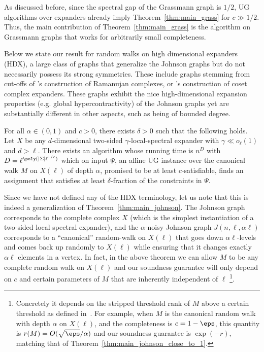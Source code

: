 As discussed before, since the spectral gap of the Grassmann graph is $1/2$, UG algorithms over expanders already imply Theorem~\ref{thm:main_grass} for $c \gg 1/2$. Thus, the main contribution of Theorem~\ref{thm:main_grass} is the algorithm on Grassmann graphs that works for arbitrarily small completeness.

Below we state our result for random walks on high dimensional expanders (HDX), a large class of graphs that generalize the Johnson graphs but do not necessarily possess its strong symmetries. These  include graphs stemming from cut-offs of \cite{lubotzky2005explicit}'s construction of Ramanujan complexes, or  \cite{kaufman2018construction}'s construction of coset complex expanders. These graphs exhibit the nice high-dimensional expansion properties (e.g. global hypercontractivity) of the Johnson graphs yet are substantially different in other aspects, such as being of bounded degree.

\begin{theorem}\label{thm:main_hdx}
For all $\alpha \in (0,1)$ and $c>0$, there exists $\delta > 0$ such that the following holds. Let $X$ be any $d$-dimensional two-sided $\gamma$-local-spectral expander with $\gamma \ll o_\ell(1)$ and $d>\ell$. There exists an algorithm whose running time is $n^{D}$ with $D = \ell^{\poly(|\Sigma|\ell^{1/c})}$ which on input $\Psi$, an affine UG instance over the canonical walk $M$ on $X(\ell)$ of depth $\alpha$, promised to be at least $c$-satisfiable, finds an assignment that satisfies 
at least $\delta$-fraction of the constraints in $\Psi$.
\end{theorem}

Since we have not defined any of the HDX terminology, let us note that this is indeed a generalization of Theorem~\ref{thm:main_johnson}. The Johnson graph corresponds to the complete complex $X$ (which is the simplest instantiation of a two-sided local spectral expander), and the $\alpha$-noisy Johnson graph $J(n,\ell,\alpha\ell)$ corresponds to a ``canonical'' random-walk on $X(\ell)$ that goes down $\alpha\ell$-levels and comes back up randomly to $X(\ell)$ while ensuring that it changes exactly $\alpha\ell$ elements in a vertex. In fact, in the above theorem we can allow $M$ to be any complete random walk on $X(\ell)$ and our soundness guarantee will only depend on $c$ and certain parameters of $M$ that are inherently independent of $\ell$ \footnote{Concretely it depends on the stripped threshold rank of $M$ above a certain threshold as defined in~\cite{DBLP:conf/soda/BafnaHKL22}. For example, when $M$ is the canonical random walk with depth $\alpha$ on $X(\ell)$, and the completeness is $c=1-\eps$, this quantity is $r(M) = O(\sqrt{\eps}/\alpha)$ and our soundness guarantee is $\exp(-r)$, matching that of Theorem~\ref{thm:main_johnson_close_to_1}.}. 


